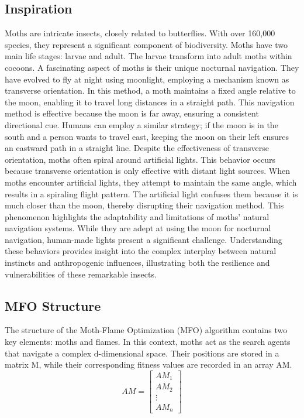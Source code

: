 \documentclass[conference]{IEEEtran}
\begin{document}
\subsection{Inspiration}
Moths are intricate insects, closely related to butterflies. With over 160,000 species, they represent a significant component of biodiversity. Moths have two main life stages: larvae and adult. The larvae transform into adult moths within cocoons.
A fascinating aspect of moths is their unique nocturnal navigation. They have evolved to fly at night using moonlight, employing a mechanism known as transverse orientation. In this method, a moth maintains a fixed angle relative to the moon, enabling it to travel long distances in a straight path. This navigation method is effective because the moon is far away, ensuring a consistent directional cue. Humans can employ a similar strategy; if the moon is in the south and a person wants to travel east, keeping the moon on their left ensures an eastward path in a straight line.
Despite the effectiveness of transverse orientation, moths often spiral around artificial lights. This behavior occurs because transverse orientation is only effective with distant light sources. When moths encounter artificial lights, they attempt to maintain the same angle, which results in a spiraling flight pattern. The artificial light confuses them because it is much closer than the moon, thereby disrupting their navigation method.
This phenomenon highlights the adaptability and limitations of moths' natural navigation systems. While they are adept at using the moon for nocturnal navigation, human-made lights present a significant challenge. Understanding these behaviors provides insight into the complex interplay between natural instincts and anthropogenic influences, illustrating both the resilience and vulnerabilities of these remarkable insects.

\subsection{MFO Structure}
The structure of the Moth-Flame Optimization (MFO) algorithm contains two key elements: moths and flames. In this context, moths act as the search agents that navigate a complex d-dimensional space. Their positions are stored in a matrix M, while their corresponding fitness values are recorded in an array AM.
\begin{equation}
    A M=\left[\begin{array}{c}
    A M_1 \\
    A M_2 \\
    \vdots \\
    A M_n
    \end{array}\right]
    \end{equation}
\end{document}
